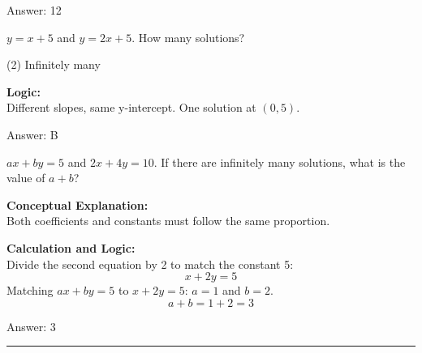 \documentclass[11pt,paper=a4,answers]{exam}
\begin{document}
\begin{questions}
\begin{solution}
\vspace{15pt}
Answer: \colorbox{yellow!100}{12}
\end{solution}

\question
$y = x + 5$ and $y = 2x + 5$. How many solutions?
\begin{tasks}(2)
    \task Infinitely many
\end{tasks}

\begin{solution}
\textbf{Logic:} \\
Different slopes, same y-intercept. One solution at $(0, 5)$.

\vspace{15pt}
Answer: \colorbox{yellow!100}{B}
\end{solution}

\question
$ax + by = 5$ and $2x + 4y = 10$. If there are infinitely many solutions, what is the value of $a + b$?

\begin{solution}
\textbf{Conceptual Explanation:} \\
Both coefficients and constants must follow the same proportion.

\vspace{10pt}
\textbf{Calculation and Logic:} \\
Divide the second equation by 2 to match the constant 5:
\[ x + 2y = 5 \]
Matching $ax + by = 5$ to $x + 2y = 5$:
$a = 1$ and $b = 2$.
\[ a + b = 1 + 2 = 3 \]

\vspace{15pt}
Answer: \colorbox{yellow!100}{3}
\end{solution}

\end{questions}
\begin{center}
\rule{.5\textwidth}{1pt}
\end{center}
\end{document}
